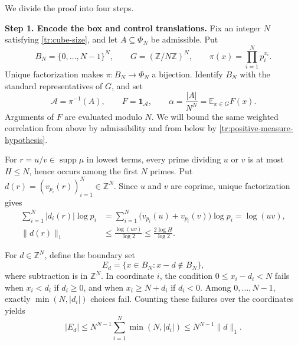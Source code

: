 \documentclass[twoside]{aomart}
\makeatletter
\theoremstyle{paperplain}
\theoremstyle{paperdefinition}
\renewenvironment{proof}[1][\proofname]{\par\pushQED{\qed}%
  \normalfont\topsep6\p@\@plus3\p@\relax\trivlist
  \item[\hskip\labelsep\itshape #1\@addpunct{.}]\ignorespaces
}{\popQED\endtrivlist\@endpefalse}
\newcommand{\E}{\mathbb E}
\newcommand{\Z}{\mathbb Z}
\numberwithin{equation}{section}
\makeatother
\begin{document}
\begin{proof}
We divide the proof into four steps.
\par
\medskip
\noindent\textbf{Step 1. Encode the box and control translations.}
Fix an integer $N$ satisfying \eqref{tr:cube-size}, and let
$A\subseteq\Phi_N$ be admissible. Put
\begin{equation*}
 B_N=\{0,\ldots,N-1\}^N,\qquad
 G=(\Z/N\Z)^N,\qquad
 \pi(x)=\prod_{i=1}^N p_i^{x_i}.
\end{equation*}
Unique factorization makes $\pi:B_N\to\Phi_N$ a bijection.
Identify $B_N$ with the standard representatives of $G$, and set
\begin{equation*}
 \mathcal A=\pi^{-1}(A),\qquad
 F=\mathbf1_{\mathcal A},\qquad
 \alpha=\frac{|A|}{N^N}=\E_{x\in G}F(x).
\end{equation*}
Arguments of $F$ are evaluated modulo $N$. We will bound the same
weighted correlation from above by admissibility and from below
by \eqref{tr:positive-measure-hypothesis}.

For $r=u/v\in\operatorname{supp}\mu$ in lowest terms, every prime
dividing $u$ or $v$ is at most $H\le N$, hence occurs among the
first $N$ primes. Put $d(r)=(v_{p_i}(r))_{i=1}^N\in\Z^N$.
Since $u$ and $v$ are coprime, unique factorization gives
\begin{equation*}
 \begin{aligned}
 \sum_{i=1}^N|d_i(r)|\log p_i
 &=\sum_{i=1}^N\bigl(v_{p_i}(u)+v_{p_i}(v)\bigr)\log p_i
 =\log(uv),\\
 \|d(r)\|_1
 &\le\frac{\log(uv)}{\log2}
 \le\frac{2\log H}{\log2}.
 \end{aligned}
\end{equation*}

For $d\in\Z^N$, define the boundary set
\begin{equation*}
 E_d=\{x\in B_N:x-d\notin B_N\},
\end{equation*}
where subtraction is in $\Z^N$. In coordinate $i$, the condition
$0\le x_i-d_i<N$ fails when $x_i<d_i$ if $d_i\ge0$, and when
$x_i\ge N+d_i$ if $d_i<0$. Among $0,\ldots,N-1$, exactly
$\min(N,|d_i|)$ choices fail. Counting these failures over the
coordinates yields
\begin{equation*}
 |E_d|\le N^{N-1}\sum_{i=1}^N\min(N,|d_i|)
       \le N^{N-1}\|d\|_1.
\end{equation*}


\end{proof}
\end{document}
